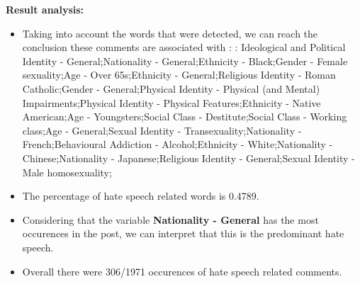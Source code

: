 \documentclass[11pt]{article}
\begin{document}
\textbf{\Large Result analysis:}

\begin{itemize}\item Taking into account the words that were detected, we can reach the conclusion these comments are associated with : : Ideological and Political Identity - General;Nationality - General;Ethnicity - Black;Gender - Female sexuality;Age - Over 65s;Ethnicity - General;Religious Identity - Roman Catholic;Gender - General;Physical Identity - Physical (and Mental) Impairments;Physical Identity - Physical Features;Ethnicity - Native American;Age - Youngsters;Social Class - Destitute;Social Class - Working class;Age - General;Sexual Identity - Transexuality;Nationality - French;Behavioural Addiction - Alcohol;Ethnicity - White;Nationality - Chinese;Nationality - Japanese;Religious Identity - General;Sexual Identity - Male homosexuality;%

\item The percentage of hate speech related words is 0.4789.

\item Considering that the variable \textbf{Nationality - General} has the most occurences in the post, we can interpret that this is the predominant hate speech.

\item Overall there were 306/1971 occurences of hate speech related comments.\end{itemize}
\end{document}
